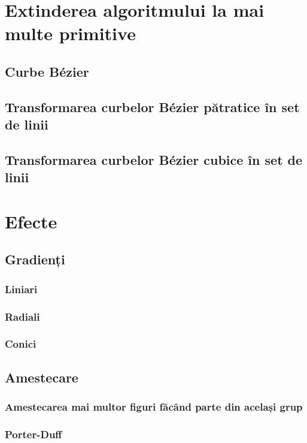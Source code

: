 \documentclass[a4paper, 12pt]{report}
\begin{document}
\chapter{Extinderea algoritmului la mai multe primitive}

\section{Curbe Bézier}

\section{Transformarea curbelor Bézier pătratice în set de linii}

\section{Transformarea curbelor Bézier cubice în set de linii}

\chapter{Efecte}

\section{Gradienți}

\subsection{Liniari}
\subsection{Radiali}
\subsection{Conici}

\section{Amestecare}
\subsection{Amestecarea mai multor figuri făcând parte din același grup}
\subsection{Porter-Duff}
\end{document}
